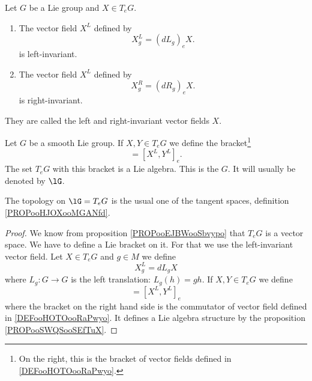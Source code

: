 \begin{propositionDef}      \label{PROPooLEIAooTnnYRw}
	Let \( G\) be a Lie group and \( X\in T_eG\).
	\begin{enumerate}
		\item
		      The vector field \( X^L\) defined by
		      \begin{equation}        \label{DEFooYPUIooAzcdjP}
			      X^L_g=(dL_g)_eX.
		      \end{equation}
		      is left-invariant.
		\item
		      The vector field \( X^L\) defined by
		      \begin{equation}
			      X^R_g=(dR_g)_eX.
		      \end{equation}
		      is right-invariant.
	\end{enumerate}
	They are called the left and right-invariant vector fields  \( X\).
\end{propositionDef}

\begin{propositionDef}      \label{DEFooKDCPooZOJsMD}
	Let \( G\) be a smooth Lie group. If \( X,Y\in T_eG\) we define the bracket\footnote{On the right, this is the bracket of vector fields defined in \ref{DEFooHOTOooRaPwyo}.}
	\begin{equation}
		[X,Y] = [X^L,Y^L]_e.
	\end{equation}
	The set \( T_eG\) with this bracket is a Lie algebra. This is the  \( G\). It will usually be denoted by \( \lG\).

	The topology on \( \lG=T_eG\) is the usual one of the tangent spaces, definition \ref{PROPooHJOXooMGANfd}.
\end{propositionDef}

\begin{proof}
	We know from proposition \ref{PROPooEJBWooSbvypo} that \( T_eG\) is a vector space. We have to define a Lie bracket on it. For that we use the left-invariant vector field. Let \( X\in T_eG\) and \( g\in M\) we define
	\begin{equation}
		X^L_g=dL_gX
	\end{equation}
	where \( L_g\colon G\to G\) is the left translation: \( L_g(h)=gh\). If \( X,Y\in T_eG\) we define
	\begin{equation}
		[X,Y]=[X^L,Y^L]_e
	\end{equation}
	where the bracket on the right hand side is the commutator of vector field defined in \ref{DEFooHOTOooRaPwyo}. It defines a Lie algebra structure by the proposition \ref{PROPooSWQSooSEfTuX}.
\end{proof}

